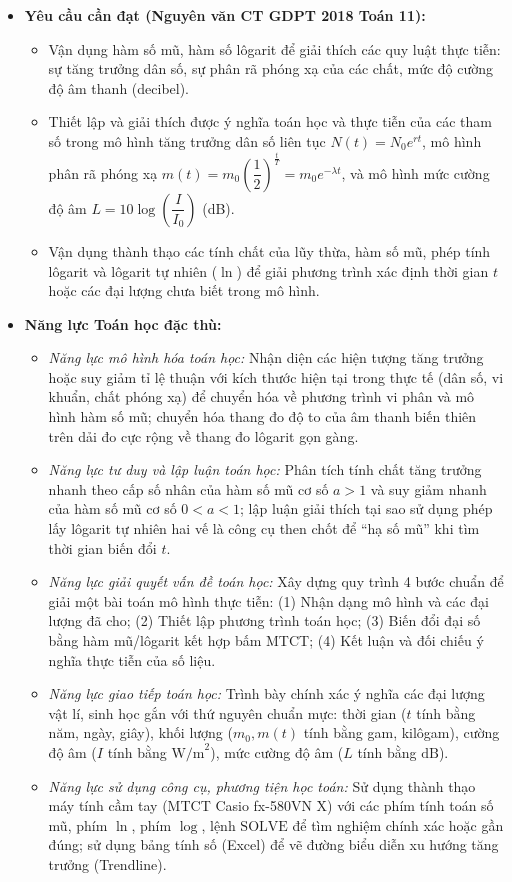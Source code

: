 \documentclass[12pt, a4paper]{article}
\begin{document}
\begin{itemize}[leftmargin=1.2cm]
    \item \textbf{Yêu cầu cần đạt (Nguyên văn CT GDPT 2018 Toán 11):}
    \begin{itemize}[leftmargin=0.6cm]
        \item Vận dụng hàm số mũ, hàm số lôgarit để giải thích các quy luật thực tiễn: sự tăng trưởng dân số, sự phân rã phóng xạ của các chất, mức độ cường độ âm thanh (decibel).
        \item Thiết lập và giải thích được ý nghĩa toán học và thực tiễn của các tham số trong mô hình tăng trưởng dân số liên tục $N(t) = N_0 e^{rt}$, mô hình phân rã phóng xạ $m(t) = m_0 \left(\dfrac{1}{2}\right)^{\frac{t}{T}} = m_0 e^{-\lambda t}$, và mô hình mức cường độ âm $L = 10 \log\left(\dfrac{I}{I_0}\right)$ (dB).
        \item Vận dụng thành thạo các tính chất của lũy thừa, hàm số mũ, phép tính lôgarit và lôgarit tự nhiên ($\ln$) để giải phương trình xác định thời gian $t$ hoặc các đại lượng chưa biết trong mô hình.
    \end{itemize}

    \item \textbf{Năng lực Toán học đặc thù:}
    \begin{itemize}[leftmargin=0.6cm]
        \item \textit{Năng lực mô hình hóa toán học:} Nhận diện các hiện tượng tăng trưởng hoặc suy giảm tỉ lệ thuận với kích thước hiện tại trong thực tế (dân số, vi khuẩn, chất phóng xạ) để chuyển hóa về phương trình vi phân và mô hình hàm số mũ; chuyển hóa thang đo độ to của âm thanh biến thiên trên dải đo cực rộng về thang đo lôgarit gọn gàng.
        \item \textit{Năng lực tư duy và lập luận toán học:} Phân tích tính chất tăng trưởng nhanh theo cấp số nhân của hàm số mũ cơ số $a > 1$ và suy giảm nhanh của hàm số mũ cơ số $0 < a < 1$; lập luận giải thích tại sao sử dụng phép lấy lôgarit tự nhiên hai vế là công cụ then chốt để ``hạ số mũ'' khi tìm thời gian biến đổi $t$.
        \item \textit{Năng lực giải quyết vấn đề toán học:} Xây dựng quy trình 4 bước chuẩn để giải một bài toán mô hình thực tiễn: (1) Nhận dạng mô hình và các đại lượng đã cho; (2) Thiết lập phương trình toán học; (3) Biến đổi đại số bằng hàm mũ/lôgarit kết hợp bấm MTCT; (4) Kết luận và đối chiếu ý nghĩa thực tiễn của số liệu.
        \item \textit{Năng lực giao tiếp toán học:} Trình bày chính xác ý nghĩa các đại lượng vật lí, sinh học gắn với thứ nguyên chuẩn mực: thời gian ($t$ tính bằng năm, ngày, giây), khối lượng ($m_0, m(t)$ tính bằng gam, kilôgam), cường độ âm ($I$ tính bằng $\text{W/m}^2$), mức cường độ âm ($L$ tính bằng $\text{dB}$).
        \item \textit{Năng lực sử dụng công cụ, phương tiện học toán:} Sử dụng thành thạo máy tính cầm tay (MTCT Casio fx-580VN X) với các phím tính toán số mũ, phím $\ln$, phím $\log$, lệnh $\text{SOLVE}$ để tìm nghiệm chính xác hoặc gần đúng; sử dụng bảng tính số (Excel) để vẽ đường biểu diễn xu hướng tăng trưởng (Trendline).
    \end{itemize}


\end{itemize}
\end{document}
